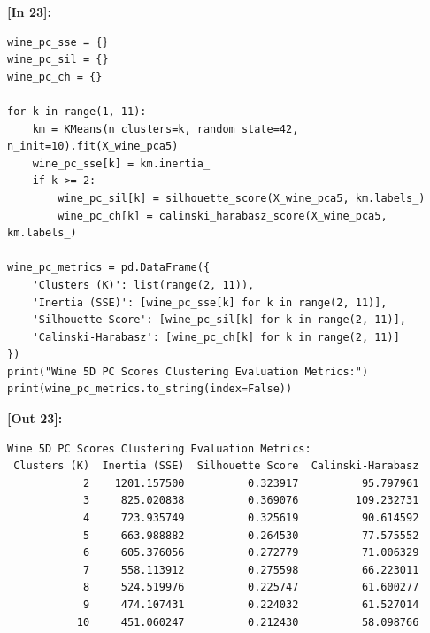\vspace{0.4em}
\noindent\textbf{\small [In 23]:}
\begin{lstlisting}[style=pycode]
wine_pc_sse = {}
wine_pc_sil = {}
wine_pc_ch = {}

for k in range(1, 11):
    km = KMeans(n_clusters=k, random_state=42, n_init=10).fit(X_wine_pca5)
    wine_pc_sse[k] = km.inertia_
    if k >= 2:
        wine_pc_sil[k] = silhouette_score(X_wine_pca5, km.labels_)
        wine_pc_ch[k] = calinski_harabasz_score(X_wine_pca5, km.labels_)

wine_pc_metrics = pd.DataFrame({
    'Clusters (K)': list(range(2, 11)),
    'Inertia (SSE)': [wine_pc_sse[k] for k in range(2, 11)],
    'Silhouette Score': [wine_pc_sil[k] for k in range(2, 11)],
    'Calinski-Harabasz': [wine_pc_ch[k] for k in range(2, 11)]
})
print("Wine 5D PC Scores Clustering Evaluation Metrics:")
print(wine_pc_metrics.to_string(index=False))
\end{lstlisting}
\noindent\textbf{\small [Out 23]:}
\begin{lstlisting}[style=output]
Wine 5D PC Scores Clustering Evaluation Metrics:
 Clusters (K)  Inertia (SSE)  Silhouette Score  Calinski-Harabasz
            2    1201.157500          0.323917          95.797961
            3     825.020838          0.369076         109.232731
            4     723.935749          0.325619          90.614592
            5     663.988882          0.264530          77.575552
            6     605.376056          0.272779          71.006329
            7     558.113912          0.275598          66.223011
            8     524.519976          0.225747          61.600277
            9     474.107431          0.224032          61.527014
           10     451.060247          0.212430          58.098766
\end{lstlisting}

